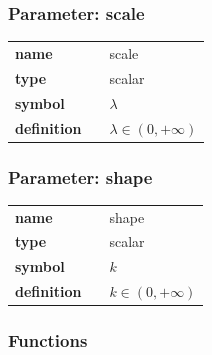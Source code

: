 \subsubsection*{Parameter: scale}

\noindent\begin{tabular}{p{2cm}cl}
\textbf{name} & & scale \\
\textbf{type} & & scalar \\
\textbf{symbol} & & $\lambda$  \\
\textbf{definition} & & $\lambda\in (0, +\infty)$
\end{tabular}
\subsubsection*{Parameter: shape}

\noindent\begin{tabular}{p{2cm}cl}
\textbf{name} & & shape \\
\textbf{type} & & scalar \\
\textbf{symbol} & & $k$  \\
\textbf{definition} & & $k\in (0, +\infty)$
\end{tabular}
\subsubsection*{Functions}

